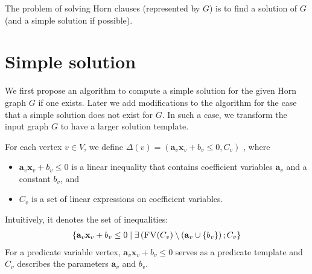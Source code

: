 \documentclass[master,final,12pt]{iscs-thesis}
\begin{document}
The problem of solving Horn clauses (represented by $G$) is to find a
solution of $G$ (and a simple solution if possible).

\section{Simple solution}

We first propose an algorithm to compute a simple solution for the
given Horn graph $G$ if one exists.  Later we add modifications to the
algorithm for the case that a simple solution does not exist for $G$.
In such a case, we transform the input graph $G$ to have a larger
solution template.

For each vertex $v \in V$, we define
$\Delta(v) = (\mathbf{a}_v \mathbf{x}_v + b_v \leq 0, C_v)$
, where
\begin{itemize}
\item $\mathbf{a}_v \mathbf{x}_v + b_v \leq 0$ is a linear inequality that
  contains coefficient variables $\mathbf{a}_v$ and a constant $b_v$,
  and
\item $C_v$ is a set of linear expressions on coefficient variables.
\end{itemize}
Intuitively, it denotes the set of inequalities:
\begin{align*}
\left\lbrace
 \mathbf{a}_v \mathbf{x}_v + b_v \leq 0 \mid
 \exists \left( \textsc{FV}(C_v)
  \setminus (\mathbf{a}_v \cup \left\lbrace b_v \right\rbrace
 \right); C_v
\right\rbrace
\end{align*}
For a predicate variable vertex, $\mathbf{a}_v \mathbf{x}_v + b_v \leq
0$ serves as a predicate template and $C_v$ describes the parameters
$\mathbf{a}_v$ and $b_v$.
\end{document}
